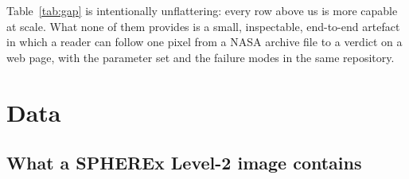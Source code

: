 \documentclass[11pt,a4paper]{article}
\begin{document}
\begin{table}[H]
\centering\small
\caption{Positioning against prior art. The novelty claimed here is narrow and deliberate: not the
algorithm, but a verified, open, reproducible instantiation on SPHEREx with an explicit negative
result.}
\label{tab:gap}
\end{table}

Table~\ref{tab:gap} is intentionally unflattering: every row above us is more capable at scale. What
none of them provides is a small, inspectable, end-to-end artefact in which a reader can follow one
pixel from a NASA archive file to a verdict on a web page, with the parameter set and the failure
modes in the same repository.

\section{Data}
\label{sec:data}

\subsection{What a SPHEREx Level-2 image contains}
\end{document}
